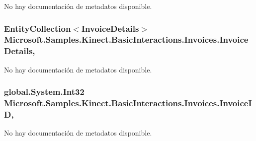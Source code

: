 No hay documentación de metadatos disponible. 

\hypertarget{class_microsoft_1_1_samples_1_1_kinect_1_1_basic_interactions_1_1_invoices_adcf148d66cba78e98881946bae7c1e59}{
\subsubsection[{Invoice\-Details}]{\setlength{\rightskip}{0pt plus 5cm}Entity\-Collection$<${\bf Invoice\-Details}$>$ Microsoft.\-Samples.\-Kinect.\-Basic\-Interactions.\-Invoices.\-Invoice\-Details\hspace{0.3cm}{\ttfamily [get]}, {\ttfamily [set]}}}\label{class_microsoft_1_1_samples_1_1_kinect_1_1_basic_interactions_1_1_invoices_adcf148d66cba78e98881946bae7c1e59}


No hay documentación de metadatos disponible. 

\hypertarget{class_microsoft_1_1_samples_1_1_kinect_1_1_basic_interactions_1_1_invoices_a0184f14c5a64ce9c102a2feee3f93e14}{
\subsubsection[{Invoice\-I\-D}]{\setlength{\rightskip}{0pt plus 5cm}global.\-System.\-Int32 Microsoft.\-Samples.\-Kinect.\-Basic\-Interactions.\-Invoices.\-Invoice\-I\-D\hspace{0.3cm}{\ttfamily [get]}, {\ttfamily [set]}}}\label{class_microsoft_1_1_samples_1_1_kinect_1_1_basic_interactions_1_1_invoices_a0184f14c5a64ce9c102a2feee3f93e14}


No hay documentación de metadatos disponible. 


